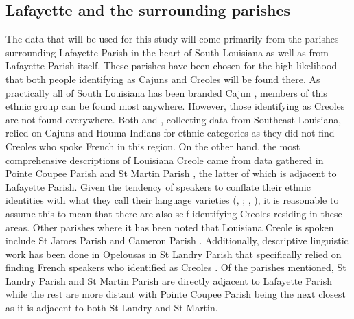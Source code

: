 \documentclass{article}\usepackage[]{graphicx}\usepackage[]{xcolor}
\begin{document}
    \subsection{Lafayette and the surrounding parishes}
      The data that will be used for this study will come primarily from the parishes surrounding Lafayette Parish in the heart of South Louisiana as well as from Lafayette Parish itself.
      These parishes have been chosen for the high likelihood that both people identifying as Cajuns and Creoles will be found there.
      As practically all of South Louisiana has been branded Cajun \parencite{giancarlo_dont_2019}, members of this ethnic group can be found most anywhere.
      However, those identifying as Creoles are not found everywhere.
      Both \textcite{rottet_language_1995} and \textcite{dajko_ethnic_2009}, collecting data from Southeast Louisiana, relied on Cajuns and Houma Indians for ethnic categories as they did not find Creoles who spoke French in this region.
      On the other hand, the most comprehensive descriptions of Louisiana Creole came from data gathered in Pointe Coupee Parish \parencite{klingler_if_2003} and St Martin Parish \parencite{neumann_creole_1985}, the latter of which is adjacent to Lafayette Parish.
      Given the tendency of speakers to conflate their ethnic identities with what they call their language varieties (\citeauthor{brown_pronominal_1988}, \citeyear[p.~5]{brown_pronominal_1988}; \citeauthor{klingler_language_2003}, \citeyear{klingler_language_2003}), it is reasonable to assume this to mean that there are also self-identifying Creoles residing in these areas.
      Other parishes where it has been noted that Louisiana Creole is spoken include St James Parish and Cameron Parish \parencite[p.~7]{rottet_language_1995}.
      Additionally, descriptive linguistic work has been done in Opelousas in St Landry Parish that specifically relied on finding French speakers who identified as Creoles \parencite{klingler_language_2003}.
      Of the parishes mentioned, St Landry Parish and St Martin Parish are directly adjacent to Lafayette Parish while the rest are more distant with Pointe Coupee Parish being the next closest as it is adjacent to both St Landry and St Martin.
\end{document}
